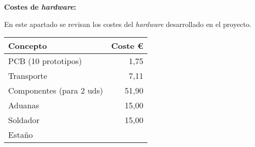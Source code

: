 \textbf{Costes de \emph{hardware}:}

En este apartado se revisan los costes del \emph{hardware} desarrollado en el proyecto.

\begin{longtable}[]{@{}lr@{}}
\toprule
\begin{minipage}[b]{0.38\columnwidth}\raggedright\strut
\textbf{Concepto}\strut
\end{minipage} & \begin{minipage}[b]{0.20\columnwidth}\raggedleft\strut
\textbf{Coste \euro{}}\strut
\end{minipage}\tabularnewline
\midrule
\endhead
\begin{minipage}[t]{0.38\columnwidth}\raggedright\strut
PCB (10 prototipos)\strut
\end{minipage} & \begin{minipage}[t]{0.20\columnwidth}\raggedleft\strut
1,75\strut
\end{minipage}\tabularnewline
\begin{minipage}[t]{0.38\columnwidth}\raggedright\strut
Transporte\strut
\end{minipage} & \begin{minipage}[t]{0.20\columnwidth}\raggedleft\strut
7,11\strut
\end{minipage}\tabularnewline
\begin{minipage}[t]{0.38\columnwidth}\raggedright\strut
Componentes (para 2 uds)\strut
\end{minipage} & \begin{minipage}[t]{0.20\columnwidth}\raggedleft\strut
51,90\strut
\end{minipage}\tabularnewline
\begin{minipage}[t]{0.38\columnwidth}\raggedright\strut
Aduanas\strut
\end{minipage} & \begin{minipage}[t]{0.20\columnwidth}\raggedleft\strut
15,00\strut
\end{minipage}\tabularnewline
\begin{minipage}[t]{0.38\columnwidth}\raggedright\strut
Soldador\strut
\end{minipage} & \begin{minipage}[t]{0.20\columnwidth}\raggedleft\strut
15,00\strut
\end{minipage}\tabularnewline
\begin{minipage}[t]{0.38\columnwidth}\raggedright\strut
Estaño\strut
\end{minipage} & \begin{minipage}[t]{0.20\columnwidth}\raggedleft\strut

\end{minipage}
\end{longtable}
